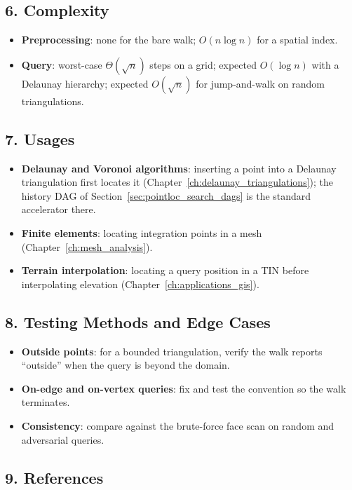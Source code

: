 \subsection{6. Complexity}

\begin{itemize}
\item \textbf{Preprocessing}: none for the bare walk; $O(n \log n)$ for a
  spatial index.
\item \textbf{Query}: worst-case $\Theta(\sqrt{n})$ steps on a grid;
  expected $O(\log n)$ with a Delaunay hierarchy; expected $O(\sqrt{n})$
  for jump-and-walk on random triangulations.
\end{itemize}

\subsection{7. Usages}

\begin{itemize}
\item \textbf{Delaunay and Voronoi algorithms}: inserting a point into a
  Delaunay triangulation first locates it (Chapter~\ref{ch:delaunay_triangulations});
  the history DAG of Section~\ref{sec:pointloc_search_dags} is the
  standard accelerator there.
\item \textbf{Finite elements}: locating integration points in a mesh
  (Chapter~\ref{ch:mesh_analysis}).
\item \textbf{Terrain interpolation}: locating a query position in a TIN
  before interpolating elevation (Chapter~\ref{ch:applications_gis}).
\end{itemize}

\subsection{8. Testing Methods and Edge Cases}

\begin{itemize}
\item \textbf{Outside points}: for a bounded triangulation, verify the walk
  reports ``outside'' when the query is beyond the domain.
\item \textbf{On-edge and on-vertex queries}: fix and test the convention
  so the walk terminates.
\item \textbf{Consistency}: compare against the brute-force face scan on
  random and adversarial queries.
\end{itemize}

\subsection{9. References}

